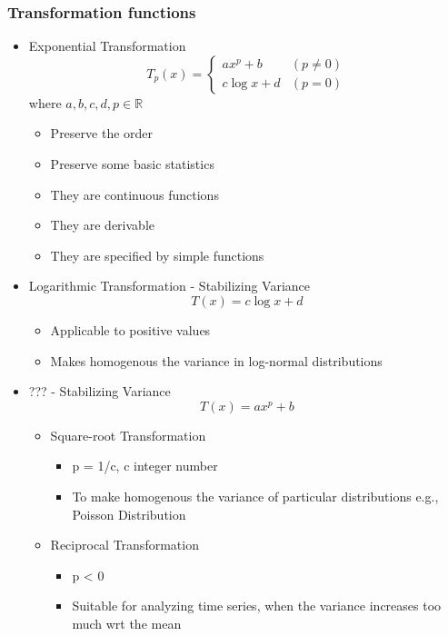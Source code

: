 \subsubsection{Transformation functions}
\begin{itemize}
	\item Exponential Transformation
	      \[
		      T_p(x) = \begin{cases}
			      ax^p + b     & (p \neq 0) \\
			      c \log x + d & (p = 0)
		      \end{cases}\]
	      where $a,b,c,d,p \in \mathbb{R}$
	      \begin{itemize}
		      \item Preserve the order
		      \item Preserve some basic statistics
		      \item They are continuous functions
		      \item They are derivable
		      \item They are specified by simple functions
	      \end{itemize}
   \item Logarithmic Transformation - Stabilizing Variance
   \[T(x) = c \log x + d\]
   \begin{itemize}
   	\item Applicable to positive values
   	\item Makes homogenous the variance in log-normal distributions
\end{itemize}
\item ??? - Stabilizing Variance
\[T(x) = ax^p + b\]
\begin{itemize}
	\item Square-root Transformation
	      \begin{itemize}
		      \item p = 1/c, c integer number
		      \item To make homogenous the variance of particular
		            distributions e.g., Poisson Distribution
	      \end{itemize}
	\item Reciprocal Transformation
	      \begin{itemize}
		      \item p < 0
		      \item Suitable for analyzing time series, when the variance
		            increases too much wrt the mean
	      \end{itemize}
\end{itemize}
\end{itemize}


